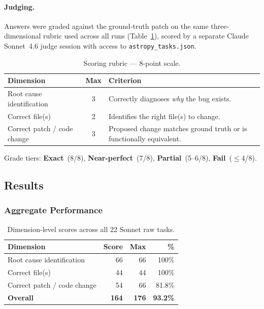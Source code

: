 \paragraph{Judging.}
Answers were graded against the ground-truth patch on the same
three-dimensional rubric used across all runs
(Table~\ref{tab:rubric-raw-sonnet}), scored by a separate Claude
Sonnet~4.6 judge session with access to \texttt{astropy\_tasks.json}.

\begin{table}[h]
\centering
\caption{Scoring rubric --- 8-point scale.}\label{tab:rubric-raw-sonnet}
\begin{tabular}{lcp{8cm}}
\toprule
\textbf{Dimension} & \textbf{Max} & \textbf{Criterion} \\
\midrule
Root cause identification   & 3 & Correctly diagnoses \emph{why} the bug exists. \\
Correct file(s)             & 2 & Identifies the right file(s) to change. \\
Correct patch / code change & 3 & Proposed change matches ground truth or is functionally equivalent. \\
\bottomrule
\end{tabular}
\end{table}

\noindent
Grade tiers: \textbf{Exact}~(8/8), \textbf{Near-perfect}~(7/8),
\textbf{Partial}~(5--6/8), \textbf{Fail}~($\le$4/8).

\subsection{Results}

\subsubsection{Aggregate Performance}

\begin{table}[h]
\centering
\caption{Dimension-level scores across all 22 Sonnet raw tasks.}\label{tab:dim-raw-sonnet}
\begin{tabular}{lrrr}
\toprule
\textbf{Dimension} & \textbf{Score} & \textbf{Max} & \textbf{\%} \\
\midrule
Root cause identification   & 66 & 66 & 100\%  \\
Correct file(s)             & 44 & 44 & 100\%  \\
Correct patch / code change & 54 & 66 & 81.8\% \\
\midrule
\textbf{Overall}            & \textbf{164} & \textbf{176} & \textbf{93.2\%} \\
\bottomrule
\end{tabular}
\end{table}

